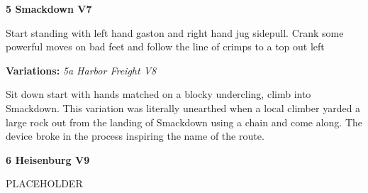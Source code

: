 \begin{multicols*}{2}
					\label{rt:Smackdown}\colorbox{Goldenrod!50}{\textbf{5 Smackdown V7 \ding{72}   }}
					\begin{adjustwidth}{0.5cm}{}
					\begin{minipage}{\linewidth}					
					Start standing with left hand gaston and right hand jug sidepull. Crank some powerful moves on bad feet and follow the line of crimps to a top out left
					\end{minipage}
						\newline \textbf{Variations:} \newline
							\label{vr:Harbor Freight}\colorbox{Goldenrod!50}{\emph{5a Harbor Freight V8  \ding{72}   }}
							\begin{adjustwidth}{0.5cm}{}
							\begin{minipage}{\linewidth}					
							Sit down start with hands matched on a blocky undercling, climb into Smackdown. This variation was literally unearthed when a local climber yarded a large rock out from the landing of Smackdown using a chain and come along. The device broke in the process inspiring the name of the route.
							\end{minipage}
							\end{adjustwidth}
					\end{adjustwidth}
					\label{rt:Heisenburg}\colorbox{Goldenrod!50}{\textbf{6 Heisenburg V9  }}
					\begin{adjustwidth}{0.5cm}{}
					\begin{minipage}{\linewidth}					
					PLACEHOLDER
					\end{minipage}
					\end{adjustwidth}


\end{multicols*}
